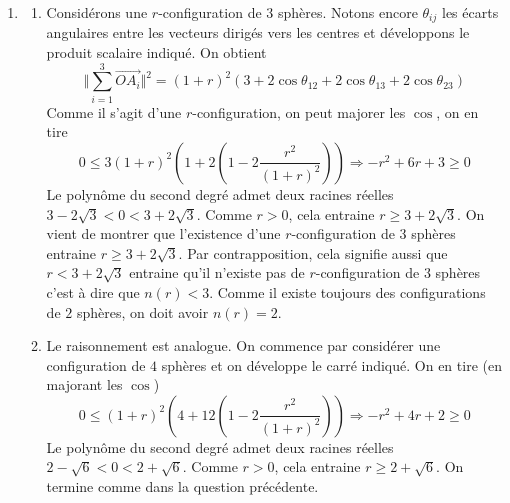 \begin{enumerate}
 \item
\begin{enumerate}
 \item Considérons une $r$-configuration de $3$ sphères. Notons encore $\theta_{ij}$ les écarts angulaires entre les vecteurs dirigés vers les centres et développons le produit scalaire indiqué. On obtient
\begin{displaymath}
 \Vert \sum _{i=1}^{3}\overrightarrow{OA_i}\Vert^2
= (1+r)^2(3+2\cos \theta_{12}+2\cos \theta_{13}+2\cos \theta_{23})
\end{displaymath}
Comme il s'agit d'une $r$-configuration, on peut majorer les $\cos$, on en tire
\begin{displaymath}
 0 \leq 3(1+r)^2\left (1+2(1-2\frac{r^2}{(1+r)^2}) \right)
\Rightarrow
-r^2 + 6r +3 \geq 0
\end{displaymath}
Le polynôme du second degré admet deux racines réelles $3- 2\sqrt{3}<0<3+ 2\sqrt{3}$. Comme $r>0$, cela entraine $r\geq 3+ 2\sqrt{3}$.\newline
On vient de montrer que l'existence d'une $r$-configuration de 3 sphères entraine $r\geq 3+ 2\sqrt{3}$. Par contrapposition, cela signifie aussi que $r< 3+ 2\sqrt{3}$ entraine qu'il n'existe pas de $r$-configuration de $3$ sphères c'est à dire que $n(r)<3$. Comme il existe toujours des configurations de $2$ sphères, on doit avoir $n(r)=2$.
 \item Le raisonnement est analogue. On commence par considérer une configuration de $4$ sphères et on développe le carré indiqué. On en tire (en majorant les $\cos$)
\begin{displaymath}
 0 \leq (1+r)^2\left (4+12(1-2\frac{r^2}{(1+r)^2}) \right)
\Rightarrow
-r^2 + 4r +2 \geq 0
\end{displaymath}
Le polynôme du second degré admet deux racines réelles $2- \sqrt{6}<0<2+ \sqrt{6}$. Comme $r>0$, cela entraine $r\geq 2+ \sqrt{6}$. On termine comme dans la question précédente.
\end{enumerate}


\end{enumerate}
